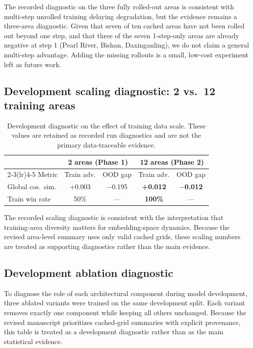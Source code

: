 \documentclass{article}
\begin{document}
The recorded diagnostic on the three fully rolled-out areas is consistent with multi-step unrolled training delaying degradation, but the evidence remains a three-area diagnostic. Given that seven of ten cached areas have not been rolled out beyond one step, and that three of the seven 1-step-only areas are already negative at step 1 (Pearl River, Bishan, Daxinganling), we do not claim a general multi-step advantage. Adding the missing rollouts is a small, low-cost experiment left as future work.

\subsection{Development scaling diagnostic: 2 vs.~12 training areas}
\label{sec:ablation_data}

\begin{table}[htbp]
\centering
\caption{Development diagnostic on the effect of training data scale. These values are retained as recorded run diagnostics and are not the primary data-traceable evidence.}
\label{tab:scaling}
\begin{tabular}{lcccc}
\toprule
 & \multicolumn{2}{c}{2 areas (Phase 1)} & \multicolumn{2}{c}{12 areas (Phase 2)} \\
\cmidrule(lr){2-3}\cmidrule(lr){4-5}
Metric & Train adv. & OOD gap & Train adv. & OOD gap \\
\midrule
Global cos.~sim. & +0.003 & $-$0.195 & \textbf{+0.012} & $\mathbf{-}$\textbf{0.012} \\
Train win rate & 50\% & --- & \textbf{100\%} & --- \\
\bottomrule
\end{tabular}
\end{table}

The recorded scaling diagnostic is consistent with the interpretation that training-area diversity matters for embedding-space dynamics. Because the revised area-level summary uses only valid cached grids, these scaling numbers are treated as supporting diagnostics rather than the main evidence.

\subsection{Development ablation diagnostic}
\label{sec:ablation}

To diagnose the role of each architectural component during model development, three ablated variants were trained on the same development split. Each variant removes exactly one component while keeping all others unchanged. Because the revised manuscript prioritizes cached-grid summaries with explicit provenance, this table is treated as a development diagnostic rather than as the main statistical evidence.
\end{document}
